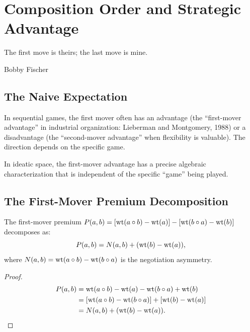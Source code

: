 \chapter{Composition Order and Strategic Advantage}

\epigraph{The first move is theirs; the last move is mine.}{Bobby Fischer}

\section{The Naive Expectation}

In sequential games, the first mover often has an advantage (the ``first-mover advantage'' in industrial organization: Lieberman and Montgomery, 1988) or a disadvantage (the ``second-mover advantage'' when flexibility is valuable). The direction depends on the specific game.

In ideatic space, the first-mover advantage has a precise algebraic characterization that is independent of the specific ``game'' being played.

\section{The First-Mover Premium Decomposition}

\begin{theorem}
The first-mover premium $P(a,b) = [\operatorname{wt}(a \circ b) - \operatorname{wt}(a)] - [\operatorname{wt}(b \circ a) - \operatorname{wt}(b)]$ decomposes as:
\[
P(a,b) = N(a,b) + (\operatorname{wt}(b) - \operatorname{wt}(a)),
\]
where $N(a,b) = \operatorname{wt}(a \circ b) - \operatorname{wt}(b \circ a)$ is the negotiation asymmetry.
\end{theorem}

\begin{proof}
\begin{align*}
P(a,b) &= \operatorname{wt}(a \circ b) - \operatorname{wt}(a) - \operatorname{wt}(b \circ a) + \operatorname{wt}(b) \\
&= [\operatorname{wt}(a \circ b) - \operatorname{wt}(b \circ a)] + [\operatorname{wt}(b) - \operatorname{wt}(a)] \\
&= N(a,b) + (\operatorname{wt}(b) - \operatorname{wt}(a)).
\end{align*}
\end{proof}

